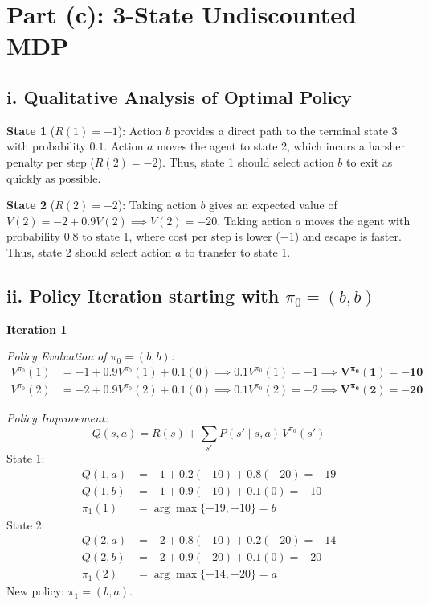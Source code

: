 \documentclass[11pt]{article}
\begin{document}
\section*{Part (c): 3-State Undiscounted MDP}

\subsection*{i. Qualitative Analysis of Optimal Policy}

\textbf{State 1} ($R(1) = -1$): Action $b$ provides a direct path to the terminal state 3
with probability $0.1$. Action $a$ moves the agent to state 2, which incurs a harsher
penalty per step ($R(2) = -2$). Thus, state 1 should select action $b$ to exit as quickly
as possible.

\textbf{State 2} ($R(2) = -2$): Taking action $b$ gives an expected value of
$V(2) = -2 + 0.9 V(2) \implies V(2) = -20$. Taking action $a$ moves the agent with
probability $0.8$ to state 1, where cost per step is lower ($-1$) and escape is faster.
Thus, state 2 should select action $a$ to transfer to state 1.

\subsection*{ii. Policy Iteration starting with $\pi_0 = (b, b)$}

\textbf{Iteration 1}

\emph{Policy Evaluation of $\pi_0 = (b, b)$:}
\begin{align*}
V^{\pi_0}(1) &= -1 + 0.9 V^{\pi_0}(1) + 0.1(0) \implies 0.1 V^{\pi_0}(1) = -1 \implies \mathbf{V^{\pi_0}(1) = -10} \\
V^{\pi_0}(2) &= -2 + 0.9 V^{\pi_0}(2) + 0.1(0) \implies 0.1 V^{\pi_0}(2) = -2 \implies \mathbf{V^{\pi_0}(2) = -20}
\end{align*}

\emph{Policy Improvement:}
\[
Q(s, a) = R(s) + \sum_{s'} P(s' \mid s, a)\, V^{\pi_0}(s')
\]
State 1:
\begin{align*}
Q(1, a) &= -1 + 0.2(-10) + 0.8(-20) = -19 \\
Q(1, b) &= -1 + 0.9(-10) + 0.1(0) = -10 \\
\pi_1(1) &= \arg\max \{-19, -10\} = b
\end{align*}
State 2:
\begin{align*}
Q(2, a) &= -2 + 0.8(-10) + 0.2(-20) = -14 \\
Q(2, b) &= -2 + 0.9(-20) + 0.1(0) = -20 \\
\pi_1(2) &= \arg\max \{-14, -20\} = a
\end{align*}
New policy: $\pi_1 = (b, a)$.
\end{document}
